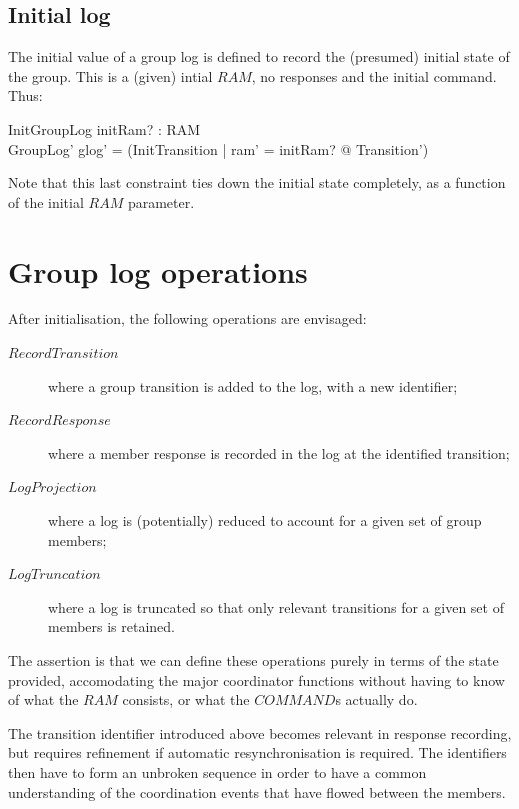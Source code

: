 \documentclass[a4paper,12pt]{article}
\begin{document}
\subsection{Initial log}

The initial value of a group log is defined to record the (presumed) initial state of the group. This is a (given) intial $RAM$, no responses and the initial command. Thus:
\begin{schema}{InitGroupLog}
	initRam? : RAM \\
	GroupLog'
\where
	glog' = \langle (\mu InitTransition | ram' = initRam? @ \theta Transition') \rangle
\end{schema}
Note that this last constraint ties down the initial state completely, as a function of the initial $RAM$ parameter.

\section{Group log operations}
After initialisation, the following operations are envisaged:
\begin{description}
\item[$RecordTransition$]
where a group transition is added to the log, with a new identifier;
\item[$RecordResponse$]
where a member response is recorded in the log at the identified transition;
\item[$LogProjection$]
where a log is (potentially) reduced to account for a given set of group members;
\item[$LogTruncation$]
where a log is truncated so that only relevant transitions for a given set of members is retained. 
\end{description}

The assertion is that we can define these operations purely in terms of the state provided, accomodating the major coordinator functions without having to know of what the $RAM$ consists, or what the $COMMAND$s actually do.

The transition identifier introduced above becomes relevant in response recording, but requires refinement if automatic resynchronisation is required. The identifiers then have to form an unbroken sequence in order to have a common understanding of the coordination events that have flowed between the members.



\end{document}
